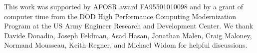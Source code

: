 \documentclass[aps,prb,twocolumn,superscriptaddress,footinbib,amsmath,amssymb,floatfix]{revtex4}
\begin{document}
\begin{acknowledgements}
This work was supported by AFOSR award FA95501010098 and by a grant 
of computer time from the DOD 
High Performance Computing Modernization Program at the US Army 
Engineer 
Research and Development Center. 
We thank Davide Donadio, Joseph Feldman, Asad Hasan, Jonathan Malen,  
Craig Maloney, Normand Mousseau, Keith Regner, and Michael Widom 
for helpful discussions.
\end{acknowledgements}



\end{document}
